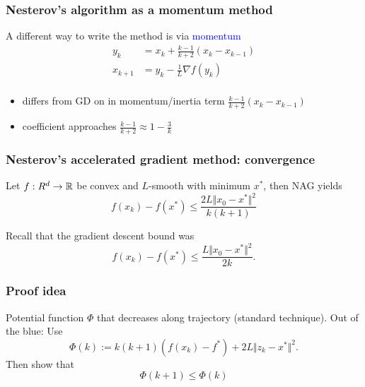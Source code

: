 \documentclass{beamer}
\begin{document}
\begin{frame}
  \frametitle{Nesterov's algorithm as a momentum method}
  A different way to write the method is via \textcolor{blue}{momentum}
  \begin{align}
    y_{k} &= x_k + \frac{k-1}{k+2} (x_k - x_{k-1}) \\
    x_{k+1} &= y_k - \frac{1}{L} \nabla f(y_k) \\
  \end{align}

  \begin{itemize}
    \item differs from GD on in momentum/inertia term $\frac{k-1}{k+2}(x_k - x_{k-1})$
    \item coefficient approaches $\frac{k-1}{k+2} \approx 1 - \frac{3}{k}$
  \end{itemize}
\end{frame}


\begin{frame}
  \frametitle{Nesterov's accelerated gradient method: convergence}

  \begin{theorem}
    Let $f: R^d \to \mathbb{R}$ be convex and $L$-smooth with minimum $x^*$, then NAG yields
    \begin{equation}
      f(x_k) - f(x^*) \le \frac{2L \Vert x_0-x^* \Vert^2}{k(k+1)}
    \end{equation}
  \end{theorem}

  Recall that the gradient descent bound was
  \begin{equation}
      f(x_k) - f(x^*) \le \frac{L \Vert x_0-x^* \Vert^2}{2k}.
  \end{equation}
\end{frame}

\begin{frame}
  \frametitle{Proof idea}
  Potential function $\Phi$ that decreases along trajectory (standard technique).
  Out of the blue: Use
  \begin{equation}
    \Phi(k) := k(k+1) (f(x_k) - f^*) + 2L \Vert z_k - x^* \Vert^2.
  \end{equation}
  Then show that
  \begin{equation}
    \Phi(k+1) \le \Phi(k)
  \end{equation}
\end{frame}
\end{document}
